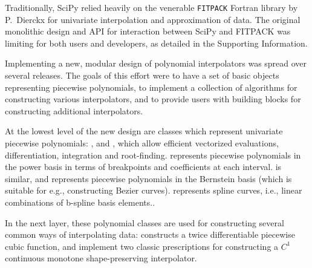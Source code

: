 Traditionally, SciPy relied heavily on the venerable \texttt{FITPACK}
Fortran library by P.~Dierckx \cite{Dierckx:1993:CSF:151103, FITPACK} for
univariate interpolation and approximation of data. The original monolithic
design and API for interaction between SciPy and FITPACK was limiting for both
users and developers, as detailed in the Supporting Information.

Implementing a new, modular design of polynomial interpolators was spread over
several releases. The goals of this effort were to have a set of basic objects
representing piecewise polynomials, to implement a collection of algorithms
for constructing various interpolators, and to provide users with building
blocks for constructing additional interpolators.

At the lowest level of the new design are classes which represent univariate
piecewise polynomials: ,  and , which allow
efficient vectorized evaluations, differentiation, integration and root-finding.
 represents piecewise polynomials in the power basis in terms of
breakpoints and coefficients at each interval.  is similar, and
represents piecewise polynomials in the Bernstein basis (which is suitable
for e.g., constructing Bezier curves).  represents spline
curves, i.e., linear combinations of b-spline basis elements.\cite{deBoor1978}. 

In the next layer, these polynomial classes are used for constructing several
common ways of interpolating data:  constructs a twice 
differentiable piecewise cubic function,  
and  implement two classic prescriptions for
constructing a $C^1$ continuous monotone shape-preserving interpolator.
\cite{FritschCarlson1980, Akima1970}
